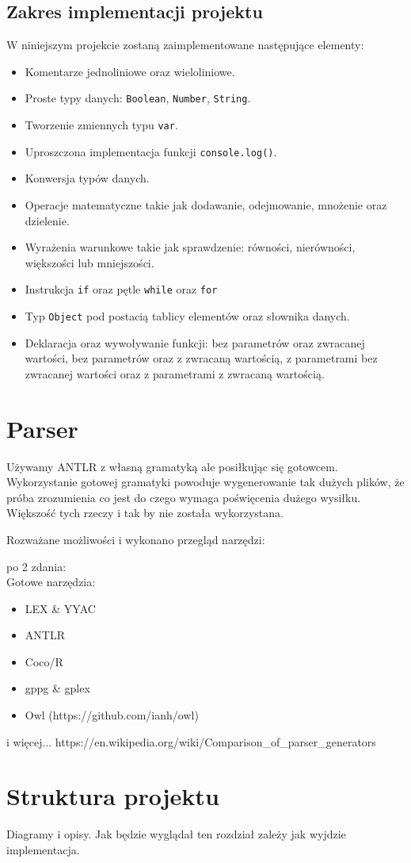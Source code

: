 \subsection{Zakres implementacji projektu}
W niniejszym projekcie zostaną zaimplementowane następujące elementy: 
\begin{itemize}
  \item Komentarze jednoliniowe oraz wieloliniowe.
  \item Proste typy danych: \texttt{Boolean}, \texttt{Number}, \texttt{String}.
  \item Tworzenie zmiennych typu \texttt{var}.
  \item Uproszczona implementacja funkcji \texttt{console.log()}.
  \item Konwersja typów danych.
  \item Operacje matematyczne takie jak dodawanie, odejmowanie, mnożenie oraz dzielenie.
  \item Wyrażenia warunkowe takie jak sprawdzenie: równości, nierówności, większości lub mniejszości.
  \item Instrukcja \texttt{if} oraz pętle \texttt{while} oraz \texttt{for}
  \item Typ \texttt{Object} pod postacią tablicy elementów oraz słownika danych.
  \item Deklaracja oraz wywoływanie funkcji: bez parametrów oraz zwracanej wartości, bez parametrów oraz z zwracaną wartością, z parametrami bez zwracanej wartości oraz z parametrami z zwracaną wartością.
\end{itemize}


\section{Parser}
Używamy ANTLR z własną gramatyką ale posiłkując się gotowcem. Wykorzystanie gotowej gramatyki powoduje wygenerowanie tak dużych plików, że próba zrozumienia co jest do czego wymaga poświęcenia dużego wysiłku. Większość tych rzeczy i tak by nie została wykorzystana.

Rozważane możliwości i wykonano przegląd narzędzi:

po 2 zdania: \\
Gotowe narzędzia:
\begin{itemize}
  \item LEX \& YYAC
  \item ANTLR
  \item Coco/R
  \item gppg \& gplex
  \item Owl (https://github.com/ianh/owl)
\end{itemize}
i więcej... https://en.wikipedia.org/wiki/Comparison\_of\_parser\_generators


\section{Struktura projektu}
Diagramy i opisy.
Jak będzie wyglądał ten rozdział zależy jak wyjdzie implementacja.
